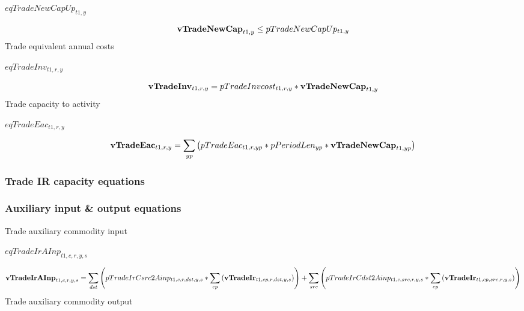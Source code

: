 \documentclass{article}
\begin{document}
$eqTradeNewCapUp_{t1,y}$





\begin{dmath}
{\bf vTradeNewCap}_{t1,y}  \le  pTradeNewCapUp_{t1,y}
\end{dmath}
Trade equivalent annual costs







$eqTradeInv_{t1,r,y}$





\begin{dmath}
{\bf vTradeInv}_{t1,r,y}  =  pTradeInvcost_{t1,r,y}*{\bf vTradeNewCap}_{t1,y}
\end{dmath}
Trade capacity to activity







$eqTradeEac_{t1,r,y}$





\begin{dmath}
{\bf vTradeEac}_{t1,r,y}  =  \sum_{yp}{\left(pTradeEac_{t1,r,yp}*pPeriodLen_{yp}*{\bf vTradeNewCap}_{t1,yp}\right)}
\end{dmath}
\subsubsection*{Trade IR capacity equations}
\subsubsection*{Auxiliary input \& output equations}
Trade auxiliary commodity input







$eqTradeIrAInp_{t1,c,r,y,s}$





\begin{dmath}
{\bf vTradeIrAInp}_{t1,c,r,y,s}  =  \sum_{dst}{\left(pTradeIrCsrc2Ainp_{t1,c,r,dst,y,s}*\sum_{cp}{\left({\bf vTradeIr}_{t1,cp,r,dst,y,s}\right)}\right)}+\sum_{src}{\left(pTradeIrCdst2Ainp_{t1,c,src,r,y,s}*\sum_{cp}{\left({\bf vTradeIr}_{t1,cp,src,r,y,s}\right)}\right)}
\end{dmath}
Trade auxiliary commodity output
\end{document}
